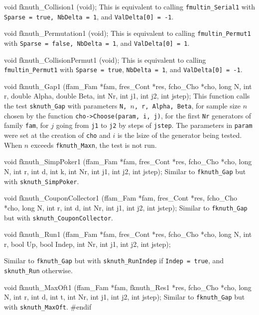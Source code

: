 void fknuth_Collision1 (void);
\endcode
\tab This is equivalent to calling {\tt fmultin\_Serial1} with
  {\tt Sparse = true, NbDelta = 1}, and {\tt Val\-Delta[0] = -1}.
 \endtab
\code


void fknuth_Permutation1 (void);
\endcode
\tab This is equivalent to  calling {\tt fmultin\_Permut1} with
  {\tt Sparse = false, NbDelta = 1}, and
  {\tt Val\-Delta[0] = 1}.
 \endtab
\code


void fknuth_CollisionPermut1 (void);
\endcode
\tab This is equivalent to  calling {\tt fmultin\_Permut1} with
  {\tt Sparse = true},  {\tt NbDelta = 1},  and {\tt Val\-Delta[0] = -1}.
 \endtab
\code


void fknuth_Gap1 (ffam_Fam *fam, fres_Cont *res, fcho_Cho *cho,
                  long N, int r, double Alpha, double Beta,
                  int Nr, int j1, int j2, int jstep);
\endcode
\tab
 This function calls the test {\tt sknuth\_Gap} with parameters
 {\tt N, $n$, r, Alpha, Beta}, for sample size $n$ chosen by the function
 {\tt cho->Choose(param, i, j)},
 for the first {\tt Nr} generators of family {\tt fam}, for $j$ going from
 {\tt j1} to {\tt j2} by steps of {\tt jstep}. The parameters in {\tt param}
 were set at the creation of {\tt cho} and $i$ is the lsize of the
 generator being tested.
 When $n$ exceeds {\tt fknuth\_Maxn}, the test is not run.
\endtab
\code


void fknuth_SimpPoker1 (ffam_Fam *fam, fres_Cont *res, fcho_Cho *cho,
                        long N, int r, int d, int k,
                        int Nr, int j1, int j2, int jstep);
\endcode
  \tab Similar to {\tt fknuth\_Gap} but with {\tt sknuth\_SimpPoker}.
  \endtab
\code


void fknuth_CouponCollector1 (ffam_Fam *fam, fres_Cont *res, fcho_Cho *cho,
                              long N, int r, int d,
                              int Nr, int j1, int j2, int jstep);
\endcode
  \tab Similar to {\tt fknuth\_Gap} but with {\tt sknuth\_CouponCollector}.
 \endtab
\code


void fknuth_Run1 (ffam_Fam *fam, fres_Cont *res, fcho_Cho *cho,
                  long N, int r, bool Up, bool Indep,
                  int Nr, int j1, int j2, int jstep);

\endcode
  \tab Similar to {\tt fknuth\_Gap} but with {\tt sknuth\_RunIndep}
  if {\tt Indep = true}, and {\tt sknuth\_Run} otherwise.
 \endtab
\code


void fknuth_MaxOft1 (ffam_Fam *fam, fknuth_Res1 *res, fcho_Cho *cho,
                     long N, int r, int d, int t,
                     int Nr, int j1, int j2, int jstep);
\endcode
  \tab Similar to {\tt fknuth\_Gap} but with {\tt sknuth\_MaxOft}.
 \endtab
\code\hide
#endif
\endhide\endcode

